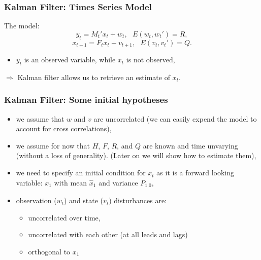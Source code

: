 \documentclass[notes=show]{beamer}%
\begin{document}
\begin{frame}
\frametitle{Kalman Filter: Times Series Model}
The model:
\bigskip
\begin{equation}
y_{t}= M_{t}' x_{t}+w_{t}, \text{     } E(w_{t},w_{t}')=R, \label{obs eq}%
\end{equation}
\begin{equation}
x_{t+1}= F_{t} x_{t}+v_{t+1}, \text{     } E(v_{t},v_{t}')=Q.\label{state eq}%
\end{equation}

\begin{center}
 \begin{itemize}
\item $y_{t}$ is an observed variable, while $x_{t}$ is not observed,
\end{itemize}
\end{center}

$\Rightarrow$ Kalman filter allows us to retrieve an estimate of $x_{t}$.

\end{frame}


\begin{frame}
\frametitle{Kalman Filter: Some initial hypotheses}

\begin{center}
 \begin{itemize}
\item we assume that $w$ and $v$ are uncorrelated (we can easily expend the model to account for cross correlations), 
\item we assume for now that $H$, $F$, $R$, and $Q$ are known and time unvarying (without a loss of generality). (Later on we will show how to estimate them),
\item we need to specify an initial condition for $x_{t}$ as it is a forward looking variable: $x_{1}$ with mean $\hat{x}_{1}$ and variance $P_{1|0}$,
\item observation ($w_{t}$) and state ($v_{t}$) disturbances are:
 \begin{itemize}
\item uncorrelated over time,
\item uncorrelated with each other (at all leads and lags)
\item orthogonal to $x_{1}$
\end{itemize}
\end{itemize}
\end{center}

\end{frame}
\end{document}
